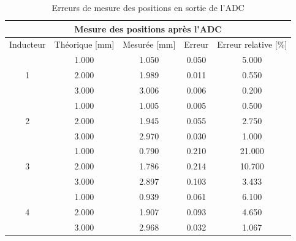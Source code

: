 \begin{table}[H]
    \centering
    \begin{tabular}{|c|c|c|c|c|}
        \hline
        \multicolumn{5}{|c|}{\textbf{Mesure des positions après l'ADC}}                                \\ \hline
        Inducteur          & Théorique {[}mm{]} & Mesurée {[}mm{]} & Erreur & Erreur relative {[}\%{]} \\ \hline
        \multirow{3}{*}{1} & 1.000              & 1.050            & 0.050  & 5.000                    \\ \cline{2-5}
                           & 2.000              & 1.989            & 0.011  & 0.550                    \\ \cline{2-5}
                           & 3.000              & 3.006            & 0.006  & 0.200                    \\ \hline
        \multirow{3}{*}{2} & 1.000              & 1.005            & 0.005  & 0.500                    \\ \cline{2-5}
                           & 2.000              & 1.945            & 0.055  & 2.750                    \\ \cline{2-5}
                           & 3.000              & 2.970            & 0.030  & 1.000                    \\ \hline
        \multirow{3}{*}{3} & 1.000              & 0.790            & 0.210  & 21.000                   \\ \cline{2-5}
                           & 2.000              & 1.786            & 0.214  & 10.700                   \\ \cline{2-5}
                           & 3.000              & 2.897            & 0.103  & 3.433                    \\ \hline
        \multirow{3}{*}{4} & 1.000              & 0.939            & 0.061  & 6.100                    \\ \cline{2-5}
                           & 2.000              & 1.907            & 0.093  & 4.650                    \\ \cline{2-5}
                           & 3.000              & 2.968            & 0.032  & 1.067                    \\ \hline
    \end{tabular}
    \caption{Erreurs de mesure des positions en sortie de l'ADC}
    \label{tab:premier_mesure_pos_adc}
\end{table}

